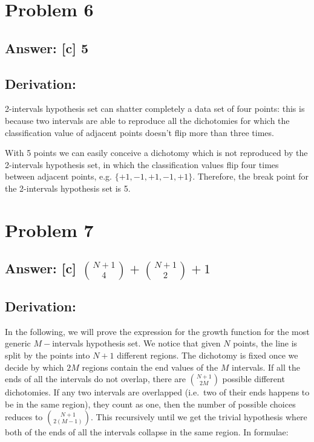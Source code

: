\documentclass[11pt]{article}
\begin{document}
    \hypertarget{problem-6}{%
\section{Problem 6}\label{problem-6}}

\hypertarget{answer-c-5}{%
\subsection{Answer: {[}c{]} 5}\label{answer-c-5}}

\hypertarget{derivation}{%
\subsection{Derivation:}\label{derivation}}

2-intervals hypothesis set can shatter completely a data set of four
points: this is because two intervals are able to reproduce all the
dichotomies for which the classification value of adjacent points
doesn't flip more than three times.

With 5 points we can easily conceive a dichotomy which is not reproduced
by the 2-intervals hypothesis set, in which the classification values
flip four times between adjacent points, e.g. \(\{+1,-1,+1,-1,+1\}\).
Therefore, the break point for the 2-intervals hypothesis set is 5.

    \hypertarget{problem-7}{%
\section{Problem 7}\label{problem-7}}

\hypertarget{answer-c-n1choose4n1choose21}{%
\subsection{\texorpdfstring{Answer: {[}c{]}
\({N+1\choose4}+{N+1\choose2}+1\)}{Answer: {[}c{]} \{N+1\textbackslash{}choose4\}+\{N+1\textbackslash{}choose2\}+1}}\label{answer-c-n1choose4n1choose21}}

\hypertarget{derivation}{%
\subsection{Derivation:}\label{derivation}}

In the following, we will prove the expression for the growth function
for the most generic \(M-\)intervals hypothesis set. We notice that
given \(N\) points, the line is split by the points into \(N+1\)
different regions. The dichotomy is fixed once we decide by which \(2M\)
regions contain the end values of the \(M\) intervals. If all the ends
of all the intervals do not overlap, there are \(N+1\choose2M\) possible
different dichotomies. If any two intervals are overlapped (i.e.~two of
their ends happens to be in the same region), they count as one, then
the number of possible choices reduces to \(N+1\choose2(M-1)\). This
recursively until we get the trivial hypothesis where both of the ends
of all the intervals collapse in the same region. In formulae:
\end{document}
